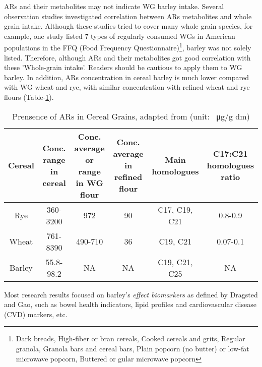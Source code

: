 ARs and their metabolites may not indicate WG barley intake. Several observation studies\cite{ISI:000309032000011,ISI:000259554500019} investigated correlation between ARs metabolites and whole grain intake. Although these studies tried to cover many whole grain species, for example, one study\cite{ISI:000259554500019} listed 7 types of regularly consumed WGs in American populations in the FFQ (Food Frequency Questionnaire)\footnote{Dark breads, High-fiber or bran cereals, Cooked cereals and grits, Regular granola, Granola bars and cereal bars, Plain popcorn (no butter) or low-fat microwave popcorn, Buttered or gular microwave popcorn}, barley was not solely listed. Therefore, although ARs and their metabolites got good correlation with these 'Whole-grain intake'. Readers should be cautious to apply them to WG barley. In addition, ARs concentration in cereal barley is much lower compared with WG wheat and rye, with similar concentration with refined wheat and rye flours (Table-\ref{table:ars_in_plant}). 
\begin{table}[h!]
		\footnotesize
\centering

\begin{tabular}{|c|c|c|c|c|c|}
	\hline 
	Cereal & \makecell{Conc. range \\in cereal}& \makecell{Conc. average \\or range \\in WG flour }& \makecell{Conc. average \\in refined \\flour} & \makecell{Main\\homologues} & \makecell{C17:C21\\ homologues\\ratio} \\ 
	\hline 
	Rye&360-3200& 972 &90&C17, C19, C21& 0.8-0.9 \\ 
	\hline 
	Wheat&761-8390& 490-710 & 36& C19, C21& 0.07-0.1 \\ 
	\hline 
	Barley& 55.8-98.2&NA & NA& C19, C21, C25&NA  \\ 
	\hline 
\end{tabular} 
	\caption{Prensence of ARs in Cereal Grains, adapted from \cite{doi:10.1021/jf0340456,ANDERSSON2010794,BORDIGA201638}(unit: \SI{}{\micro\gram}/g dm)}
	\label{table:ars_in_plant}
\end{table}


Most research results focused on barley's \textit{effect biomarkers} as defined by Dragsted\cite{Dragsted2017} and Gao\cite{Gao2017}, such as bowel health indicators, lipid profiles and cardiovascular disease (CVD) markers, etc.

